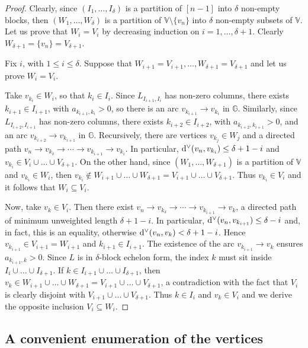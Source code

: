 \documentclass[ALCO]{cedram}
\newcommand{\mbg}{\mbox{$\mathbb{G}$}}
\newcommand{\mbv}{\mbox{$\mathbb{V}$}}
\newcommand{\ud}{\mbox{${\rm d}^\vee$}}
\begin{document}
\begin{proof}
Clearly, since $(I_1,\ldots, I_\delta)$ is a partition of $[n-1]$ into
$\delta$ non-empty blocks, then $(W_1,\ldots ,W_{\delta})$ is a
partition of $\mbv\setminus\{v_n\}$ into $\delta$ non-empty subsets of
$\mbv$. Let us prove that $W_i=V_i$ by decreasing induction on
$i=1,\ldots ,\delta+1$. Clearly $W_{\delta+1}=\{v_n\}=V_{\delta+1}$.

Fix $i$, with $1\leq i\leq\delta$. Suppose that
$W_{i+1}=V_{i+1},\ldots ,W_{\delta+1}=V_{\delta+1}$ and let us prove
$W_i=V_i$.

Take $v_{k_i}\in W_i$, so that $k_i\in I_i$.  Since
$L_{I_{i+1},I_{i}}$ has non-zero columns, there exists $k_{i+1}\in
I_{i+1}$, with $a_{k_{i+1},k_i}>0$, so there is an arc $v_{k_{i+1}}\to
v_{k_i}$ in $\mbg$. Similarly, since $L_{I_{i+2},I_{i+1}}$ has
non-zero columns, there exists $k_{i+2}\in I_{i+2}$, with
$a_{k_{i+2},k_{i+1}}>0$, and an arc $v_{k_{i+2}}\to v_{k_{i+1}}$ in
$\mbg$. Recursively, there are vertices $v_{k_j}\in W_{j}$ and a
directed path $v_n\to v_{k_{\delta}}\to\cdots \to v_{k_{i+1}}\to
v_{k_i}$. In particular, $\ud(v_n,v_{k_i})\leq \delta+1-i$ and
$v_{k_i}\in V_{i}\cup\ldots \cup V_{\delta+1}$. On the other hand, since
$(W_1,\ldots ,W_{\delta+1})$ is a partition of $\mbv$ and $v_{k_i}\in
W_i$, then $v_{k_i}\not\in W_{i+1}\cup\ldots \cup
W_{\delta+1}=V_{i+1}\cup\ldots\cup V_{\delta+1}$. Thus $v_{k_i}\in
V_i$ and it follows that $W_i\subseteq V_i$.

Now, take $v_{k}\in V_i$. Then there exist $v_n\to
v_{k_\delta}\to\cdots \to v_{k_{i+1}}\to v_k$, a directed path of
minimum unweighted length $\delta+1-i$. In particular,
$\ud(v_n,v_{k_{i+1}})\leq \delta-i$ and, in fact, this is an equality,
otherwise $\ud(v_n,v_k)<\delta+1-i$. Hence $v_{k_{i+1}}\in
V_{i+1}=W_{i+1}$ and $k_{i+1}\in I_{i+1}$. The existence of the arc
$v_{k_{i+1}}\to v_k$ ensures $a_{k_{i+1},k}>0$. Since $L$ is in
$\delta$-block echelon form, the index $k$ must sit inside
$I_i\cup\ldots \cup I_{\delta +1}$. If $k\in I_{i+1}\cup\ldots \cup
I_{\delta+1}$, then $v_k\in W_{i+1}\cup\ldots \cup
W_{\delta+1}=V_{i+1}\cup\ldots\cup V_{\delta+1}$, a contradiction with
the fact that $V_i$ is clearly disjoint with $V_{i+1}\cup\ldots\cup
V_{\delta+1}$.  Thus $k\in I_{i}$ and $v_k\in V_i$ and we derive the
opposite inclusion $V_i\subseteq W_i$.
\end{proof}

\subsection{A convenient enumeration of the vertices} 
\end{document}
